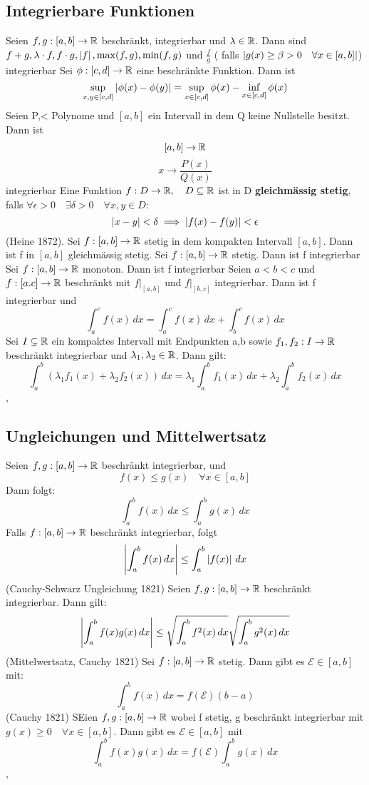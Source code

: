 \subsection{Integrierbare Funktionen}
 Seien \(f,g : [a,b] \rightarrow \mathbb{R} \) beschränkt, integrierbar und \( \lambda \in \mathbb{R} \). Dann sind \(f+g, \lambda \cdot f, f \cdot g, \left\lvert f \right\rvert, \max(f,g), \min(f,g) \) und \( \frac{f}{g}\) ( falls \( \left\lvert g(x) \geq \beta > 0 \quad \forall x \in [a,b] \right\rvert\)) integrierbar
 Sei \( \phi : [c,d] \rightarrow \mathbb{R} \) eine beschränkte Funktion. Dann ist
\[\sup_{x,y \in [c,d]} \left\lvert \phi(x) - \phi(y ) \right\rvert = \sup_{ x \in [c,d]} \phi(x) - \inf_{ x \in [c,d]} \phi(x)\]
 Seien P,< Polynome und \([a,b]\) ein Intervall in dem Q keine Nullstelle besitzt. Dann ist
\[ [a,b] \rightarrow \mathbb{R} \]
\[ x \rightarrow \frac{P(x)}{Q(x)}\]
integrierbar
 Eine Funktion \(f: D \rightarrow \mathbb{R}, \quad D \subseteq \mathbb{R}  \) ist in D \textbf{gleichmässig stetig}, falls \( \forall \epsilon > 0 \quad \exists \delta > 0 \quad \forall x,y \in D : \)
\[ \left\lvert x-y \right\rvert < \delta \implies \left\lvert f(x) - f(y) \right\rvert < \epsilon \]
 (Heine 1872). Sei \(f : [a,b] \rightarrow \mathbb{R}\) stetig in dem kompakten Intervall \([a,b]\). Dann ist f in \([a,b]\) gleichmässig stetig.
 Sei \(f: [a,b] \rightarrow \mathbb{R} \) stetig. Dann ist f integrierbar
 Sei \(f: [a,b] \rightarrow \mathbb{R}\) monoton. Dann ist f integrierbar
 Seien \(a < b < c \) und \(f : [a.c] \rightarrow \mathbb{R} \) beschränkt mit \(f |_{[a,b]}\) und \(f |_{[b,c]}\) integrierbar. Dann ist f integrierbar und
\[ \int_{a}^{c} f(x) \,dx = \int_{a}^{c} f(x) \,dx + \int_{b}^{c} f(x) \,dx \]
 Sei \(I \subsetneq \mathbb{R} \) ein kompaktes Intervall mit Endpunkten a,b sowie \(f_1, f_2 : I \rightarrow \mathbb{R} \)  beschränkt integrierbar und \( \lambda_1, \lambda_2 \in \mathbb{R} \). Dann gilt:
\[ \int_{a}^{b} ( \lambda_1 f_1(x) + \lambda_2 f_2(x)) \,dx = \lambda_1 \int_{a}^{b} f_1(x) \,dx + \lambda_2 \int_{a}^{b} f_2(x) \,dx \]
\sep
\subsection{Ungleichungen und Mittelwertsatz}
 Seien \(f,g : [a,b] \rightarrow \mathbb{R} \) beschränkt integrierbar, und
\[ f(x) \leq g(x) \quad \forall x \in [a,b]\]
Dann folgt:
\[ \int_{a}^{b} f(x) \,dx \leq \int_{a}^{b} g(x) \,dx \]
 Falls \(f: [a,b] \rightarrow \mathbb{R} \) beschränkt integrierbar, folgt
\[ \left\lvert  \int_{a}^{b} f(x) \,dx \right\rvert \leq \int_{a}^{b} \left\lvert f(x) \right\rvert \,dx \]
(Cauchy-Schwarz Ungleichung 1821)
Seien \(f,g : [a,b] \rightarrow \mathbb{R} \) beschränkt integrierbar. Dann gilt:
\[ \left\lvert \int_{a}^{b} f(x) g(x) \,dx \right\rvert \leq \sqrt{\int_{a}^{b} f^2(x) \,dx} \sqrt{\int_{a}^{b} g^2(x) \,dx }\]
(Mittelwertsatz, Cauchy 1821)
Sei \(f: [a,b] \rightarrow \mathbb{R} \) stetig. Dann gibt es \(\mathcal{E} \in [a,b]\) mit:
\[ \int_{a}^{b} f(x) \,dx = f(\mathcal{E})(b-a)\]
(Cauchy 1821) SEien \(f,g : [a,b] \rightarrow \mathbb{R} \) wobei f stetig, g beschränkt integrierbar mit \(g(x) \geq 0 \quad \forall x \in [a,b]\). Dann gibt es \(\mathcal{E} \in [a,b] \) mit
\[ \int_{a}^{b} f(x)g(x) \,dx = f(\mathcal{E}) \int_{a}^{b} g(x) \,dx \]
\sep
